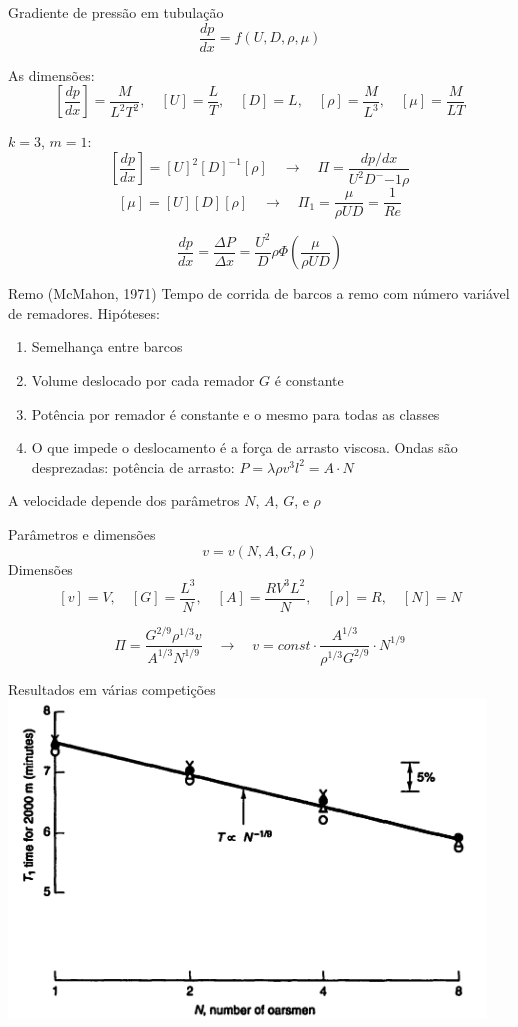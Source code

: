 \documentclass{beamer}
\newcommand{\lra}{\ensuremath{\longrightarrow}}
\newcommand{\qrq}{\ensuremath{\quad\lra\quad}}
\begin{document}
\begin{frame}{Gradiente de pressão em tubulação}
  \[
  \frac{dp}{dx} = f(U, D, \rho, \mu)
  \]

  As dimensões:
  \[
  \left[\frac{dp}{dx}\right] = \frac{M}{L^2T^2}, \quad [U] = \frac{L}{T}, \quad [D] = L, \quad [\rho] = \frac{M}{L^3}, \quad [\mu] = \frac{M}{LT}
  \]

  $k=3$, $m=1$:
  \[
  \left[\frac{dp}{dx}\right] = [U]^2[D]^{-1}[\rho] \qrq \Pi = \frac{dp/dx}{U^2D^-{-1}\rho}
  \]
  \[
    [\mu] = [U][D][\rho] \qrq \Pi_1 = \frac{\mu}{\rho U D} = \frac{1}{Re}
    \]

    \[
    \frac{dp}{dx} = \frac{\Delta P}{\Delta x} = \frac{U^2}{D} \rho \Phi\left(\frac{\mu}{\rho U D}\right)
    \]
    
        
  
\end{frame}

\begin{frame}{Remo (McMahon, 1971)}
  Tempo de corrida de barcos a remo com número variável de remadores. Hipóteses:
  \begin{enumerate}
  \item Semelhança entre barcos
  \item Volume deslocado por cada remador $G$ é constante
  \item Potência por remador é constante e o mesmo para todas as classes
  \item O que impede o deslocamento é a força de arrasto viscosa. Ondas são desprezadas: potência de arrasto: $P = \lambda \rho v^3 l^2 = A\cdot N$
  \end{enumerate}
  A velocidade depende dos parâmetros $N$, $A$, $G$, e $\rho$
\end{frame}

\begin{frame}{Parâmetros e dimensões}
  \[
  v = v(N, A, G, \rho)
  \]
  Dimensões
  \[
    [v] = V, \quad [G] = \frac{L^3}{N}, \quad [A] = \frac{R V^3 L^2}{N}, \quad [\rho] = R, \quad [N] = N
    \]

    \[
    \Pi = \frac{G^{2/9}\rho^{1/3} v }{A^{1/3} N^{1/9}} \quad\longrightarrow\quad v = const \cdot \frac{A^{1/3}}{\rho^{1/3}G^{2/9}}\cdot N^{1/9}
    \]
    
  
\end{frame}

\begin{frame}{Resultados em várias competições}
  \centering
  \includegraphics[width=0.95\textwidth]{./figuras/remo.png}
\end{frame}
\end{document}
